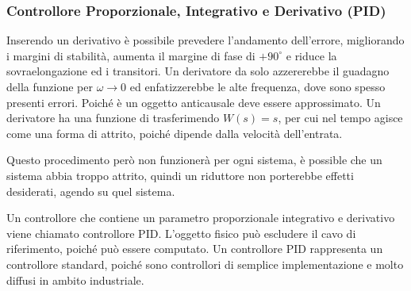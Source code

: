 \documentclass{article}
\numberwithin{equation}{subsection}
\begin{document}
\begin{center}\end{center}

\subsubsection{Controllore Proporzionale, Integrativo e Derivativo (PID)}

Inserendo un derivativo è possibile prevedere l'andamento dell'errore, migliorando i margini di stabilità, aumenta il margine di fase di $+90^{\circ}$ e riduce la 
sovraelongazione ed i transitori. Un derivatore da solo azzererebbe il guadagno della funzione per $\omega\to0$ ed enfatizzerebbe le alte frequenza, dove sono spesso 
presenti errori. Poiché è un oggetto anticausale deve essere approssimato. Un derivatore ha una funzione di trasferimendo $W(s)=s$, per cui nel tempo agisce come 
una forma di attrito, poiché dipende dalla velocità dell'entrata. 

Questo procedimento 
però non funzionerà per ogni sistema, è possible che un sistema abbia troppo attrito, quindi un riduttore non porterebbe effetti desiderati, agendo su quel sistema.  



Un controllore che contiene un parametro proporzionale 
integrativo e derivativo viene chiamato controllore PID. L'oggetto fisico può escludere il cavo di riferimento, poiché può essere computato. 
Un controllore PID rappresenta un controllore standard, poiché sono controllori di semplice implementazione e molto diffusi in ambito industriale. 
\end{document}
